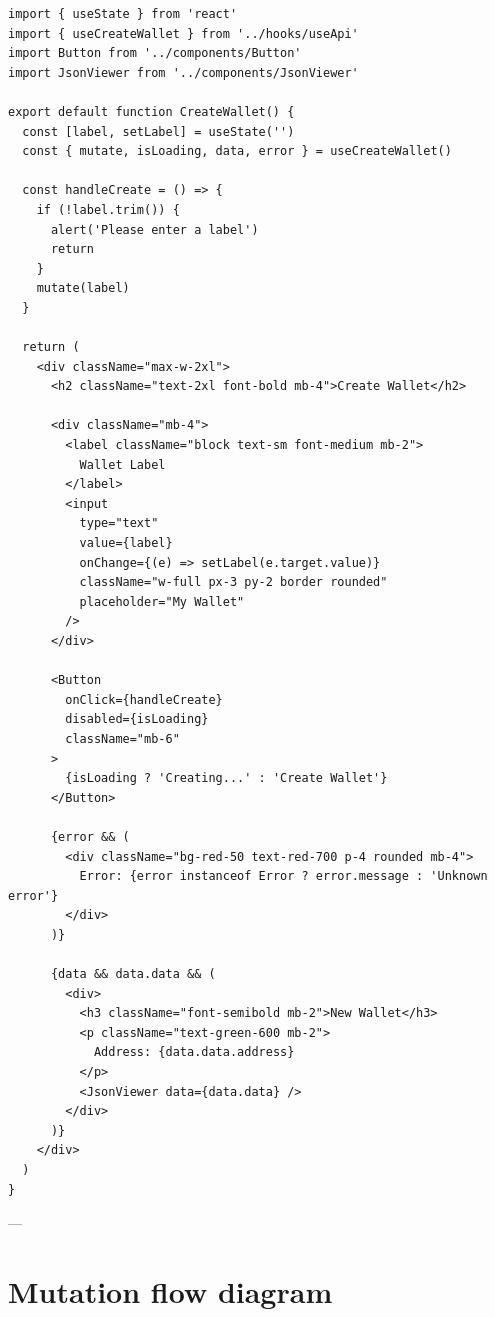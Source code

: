 \begin{listing}[htbp]
\caption{Create wallet mutation --- user interaction + async update}
\label{lst:ch21-create-wallet}
\begin{verbatim}
import { useState } from 'react'
import { useCreateWallet } from '../hooks/useApi'
import Button from '../components/Button'
import JsonViewer from '../components/JsonViewer'

export default function CreateWallet() {
  const [label, setLabel] = useState('')
  const { mutate, isLoading, data, error } = useCreateWallet()

  const handleCreate = () => {
    if (!label.trim()) {
      alert('Please enter a label')
      return
    }
    mutate(label)
  }

  return (
    <div className="max-w-2xl">
      <h2 className="text-2xl font-bold mb-4">Create Wallet</h2>

      <div className="mb-4">
        <label className="block text-sm font-medium mb-2">
          Wallet Label
        </label>
        <input
          type="text"
          value={label}
          onChange={(e) => setLabel(e.target.value)}
          className="w-full px-3 py-2 border rounded"
          placeholder="My Wallet"
        />
      </div>

      <Button
        onClick={handleCreate}
        disabled={isLoading}
        className="mb-6"
      >
        {isLoading ? 'Creating...' : 'Create Wallet'}
      </Button>

      {error && (
        <div className="bg-red-50 text-red-700 p-4 rounded mb-4">
          Error: {error instanceof Error ? error.message : 'Unknown error'}
        </div>
      )}

      {data && data.data && (
        <div>
          <h3 className="font-semibold mb-2">New Wallet</h3>
          <p className="text-green-600 mb-2">
            Address: {data.data.address}
          </p>
          <JsonViewer data={data.data} />
        </div>
      )}
    </div>
  )
}
\end{verbatim}
\end{listing}

---

\section{Mutation flow diagram}
\label{sec:mutation-flow}

